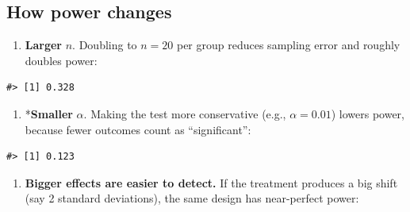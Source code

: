 \documentclass[
  letterpaper,
  DIV=11,
  numbers=noendperiod]{scrreprt}
\newenvironment{Shaded}{\begin{snugshade}}{\end{snugshade}}
\newcommand{\AttributeTok}[1]{\textcolor[rgb]{0.40,0.45,0.13}{#1}}
\newcommand{\CommentTok}[1]{\textcolor[rgb]{0.37,0.37,0.37}{#1}}
\newcommand{\ConstantTok}[1]{\textcolor[rgb]{0.56,0.35,0.01}{#1}}
\newcommand{\ControlFlowTok}[1]{\textcolor[rgb]{0.00,0.23,0.31}{\textbf{#1}}}
\newcommand{\DecValTok}[1]{\textcolor[rgb]{0.68,0.00,0.00}{#1}}
\newcommand{\FunctionTok}[1]{\textcolor[rgb]{0.28,0.35,0.67}{#1}}
\newcommand{\NormalTok}[1]{\textcolor[rgb]{0.00,0.23,0.31}{#1}}
\newcommand{\OtherTok}[1]{\textcolor[rgb]{0.00,0.23,0.31}{#1}}
\newcommand{\SpecialCharTok}[1]{\textcolor[rgb]{0.37,0.37,0.37}{#1}}
\providecommand{\tightlist}{%
  \setlength{\itemsep}{0pt}\setlength{\parskip}{0pt}}
\begin{document}
\subsection{How power changes}\label{how-power-changes}

\begin{enumerate}
\def\labelenumi{\arabic{enumi}.}
\tightlist
\item
  \textbf{Larger} \(n\). Doubling to \(n=20\) per group reduces sampling
  error and roughly doubles power:
\end{enumerate}

\begin{verbatim}
#> [1] 0.328
\end{verbatim}

\begin{enumerate}
\def\labelenumi{\arabic{enumi}.}
\setcounter{enumi}{1}
\tightlist
\item
  *\textbf{Smaller} \(\alpha\). Making the test more conservative (e.g.,
  \(\alpha=0.01\)) lowers power, because fewer outcomes count as
  ``significant'':
\end{enumerate}

\begin{verbatim}
#> [1] 0.123
\end{verbatim}

\begin{enumerate}
\def\labelenumi{\arabic{enumi}.}
\setcounter{enumi}{2}
\tightlist
\item
  \textbf{Bigger effects are easier to detect.} If the treatment
  produces a big shift (say 2 standard deviations), the same design has
  near-perfect power:
\end{enumerate}

\begin{Shaded}
\end{Shaded}
\end{document}
